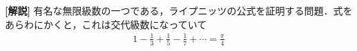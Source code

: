 \documentclass[a4paper,10pt]{ltjsarticle}
\begin{document}
\begin{multicols}{2}
  \vspace{10pt}
  {\bf[解説]}
  有名な無限級数の一つである，ライプニッツの公式を証明する問題．式をあらわにかくと，これは交代級数になっていて
  \begin{align*}
    1-\frac{1}{3}+\frac{1}{5}-\frac{1}{7}+\cdots = \frac{\pi}{4}
  \end{align*}

  \newpage
\end{multicols}
\end{document}
